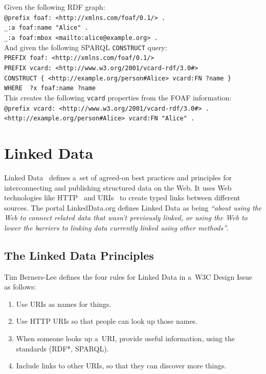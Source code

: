 \noindent Given the following RDF graph:\\

\texttt{@prefix foaf: <http://xmlns.com/foaf/0.1/> .}\\
\texttt{\indent \_:a foaf:name "Alice" .}\\
\texttt{\indent \_:a foaf:mbox <mailto:alice@example.org> .}\\

\noindent And given the following SPARQL \texttt{CONSTRUCT} query:\\

\texttt{PREFIX foaf: <http://xmlns.com/foaf/0.1/>}\\
\texttt{\indent PREFIX vcard: <http://www.w3.org/2001/vcard-rdf/3.0\#>}\\
\texttt{\indent CONSTRUCT \{ <http://example.org/person\#Alice> vcard:FN ?name \}}\\
\texttt{\indent WHERE { ?x foaf:name ?name }}\\

\noindent This creates the following \texttt{vcard} properties from the FOAF information:\\

\texttt{@prefix vcard: <http://www.w3.org/2001/vcard-rdf/3.0\#> .}\\ 
\texttt{\indent <http://example.org/person\#Alice> vcard:FN "Alice" .}

\section{Linked Data}
Linked Data~\cite{BernersLee2006} defines a~set of agreed-on best practices and
principles for interconnecting and publishing structured data on the Web.
It uses Web technologies like HTTP~\cite{Fielding1999} and URIs~\cite{BernersLee2005}
to create typed links between different sources.
The portal LinkedData.org defines Linked Data as being
\textit{``about using the Web to connect related data that wasn’t previously linked,
or using the Web to lower the barriers to linking data currently linked using other methods''}. 

\subsection{The Linked Data Principles}
Tim Berners-Lee defines the four rules for Linked Data in a~W3C Design Issue~\cite{BernersLee2006} as follows:
\begin{enumerate}
\item Use URIs as names for things.
\item Use HTTP URIs so that people can look up those names.
\item When someone looks up a~URI, provide useful information, using the standards (RDF*, SPARQL).
\item Include links to other URIs, so that they can discover more things.
\end{enumerate}

